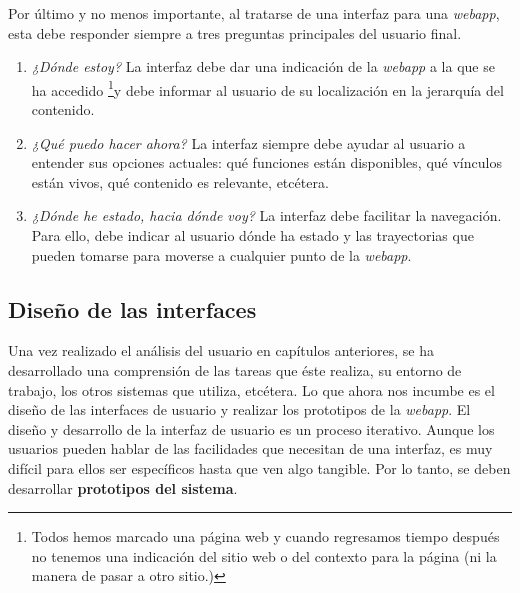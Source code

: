 \documentclass[a4paper,oneside,11pt]{book}
\begin{document}
	Por último y no menos importante, al tratarse de una interfaz para una \textit{webapp}, esta debe responder siempre a tres preguntas principales del usuario final.
	\begin{enumerate}
		\item \textit{¿Dónde estoy?} La interfaz debe dar una indicación de la \textit{webapp} a la que se ha accedido \footnote{Todos hemos marcado una página web y cuando regresamos tiempo después no tenemos una indicación del sitio web o del contexto para la página (ni la manera de pasar a otro sitio.)}y debe informar al usuario de su localización en la jerarquía del contenido.
		\item \textit{¿Qué puedo hacer ahora?} La interfaz siempre debe ayudar al usuario a entender sus opciones actuales: qué funciones están disponibles, qué vínculos están vivos, qué contenido es relevante, etcétera.
		\item \textit{¿Dónde he estado, hacia dónde voy?} La interfaz debe facilitar la navegación. Para ello, debe indicar al usuario dónde ha estado y las trayectorias que pueden tomarse para moverse a cualquier punto de la \textit{webapp}.
	\end{enumerate}
	
	
	
	\subsection{Diseño de las interfaces} %
	\label{sec:iu_diseno}
	
	Una vez realizado el análisis del usuario en capítulos anteriores, se ha desarrollado una comprensión de las tareas que éste realiza, su entorno de trabajo, los otros sistemas que utiliza, etcétera. Lo que ahora nos incumbe es el diseño de las interfaces de usuario y realizar los prototipos de la \textit{webapp}. El diseño y desarrollo de la interfaz de usuario es un proceso iterativo. Aunque los usuarios pueden hablar de las facilidades que necesitan de una interfaz, es muy difícil para ellos ser específicos hasta que ven algo tangible. Por lo tanto, se deben desarrollar \textbf{prototipos del sistema}.
	
\end{document}
